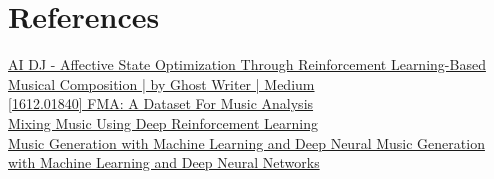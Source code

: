 \documentclass{article}
\begin{document}
\section{References}

\href{https://medium.com/@freeasabird7774/ai-dj-affective-state-optimization-through-reinforcement-learning-based-musical-composition-491d114976cf}{AI DJ - Affective State Optimization Through Reinforcement Learning-Based Musical Composition | by Ghost Writer | Medium}\\

\href{https://arxiv.org/abs/1612.01840}{[1612.01840] FMA: A Dataset For Music Analysis}\\

\href{https://www.diva-portal.org/smash/get/diva2:1383502/FULLTEXT01.pdf}{Mixing Music Using Deep Reinforcement Learning}\\

\href{https://pdf.sciencedirectassets.com/280203/1-s2.0-S1877050924X00162/1-s2.0-S1877050924027522/main.pdf?X-Amz-Security-Token=IQoJb3JpZ2luX2VjEJP%2F%2F%2F%2F%2F%2F%2F%2F%2F%2FwEaCXVzLWVhc3QtMSJHMEUCIQCSggW9gXjM%2FDfWHlQed%2FrFBZfW7O9wZSjKbE7nEdFhxAIgO5oSFbdrJ3DHKkGAxV0vHonWng0LZSKHsbbvepBC1xsqsgUIWxAFGgwwNTkwMDM1NDY4NjUiDDcL9YvR9vmpMF07IiqPBct11NEjtBETvJVACjYYtiP2LQMlD8L6MWJwH70XuApLJqdF8U8Csxqb8fK6ZOd32Nh18UCEZmyN%2FC6XGX8ykVwFsVv1EnFFvQcNGo6qvOBZEv1lgekx%2BRW2vkQgKZ2yBukwjsxFJydfCx6C2RTJjQ4UgRvJ5JQ68soo8q2WMZ%2FRux6XEqrGmnqW2JUa%2BMIlAlefH17TfCGEVWy%2F%2Fg8GpQsl2f4UkJvzfRIuvSXeCO8L39EAwAkNpYZ3Btcz1P32g34034RPRuIzlv7Aj%2FEJ%2BOlFXhyy1WSTOn7kMzsdIm16nzPeN4b8o5fkyYPINZXdSzVlqZ6dU%2BTrV8Dm4j1Ceb6X25e2d766KPsUBqGTdvv7UJBjE4zia4ImNQ5FJyTvEwl%2FvYnWfkcQio3p%2FkJTOq72YqeKCtaCT3n9DztyaUiFsjPuWscO0%2BZzdWdHp3xWvjwCePLFHOxDtofTDANpQg4e2Y2nYsle7m83CzINSmfX45mV7q4l9q3wbB8QAJMFzMrMe6rs3ruJHCG4tM03o79JH%2FOeOgr1W3iuwC%2FbA100FP7mu%2BGOARpUquH%2FQuSkuJQ3rCBfHZjl%2F509WMJJS7WpRp%2FNGfvfGS7ZdalblKejwheMp1JCc0wT3g63TS%2B2uJN82N1uQcvQkAuZ3hNp3oC%2Bx3fHZcxze6ret41Jh5JQxwhdxpJeLz3mYFsNRqNFblxh6jV1nS7huRcxrLC%2FoLuW%2F5RTGb2l%2FX%2FbG%2Ft6L1pQ2thn2v5MgSKOVPfhvPx3SZP6rOs73XzX3I0%2B8tKopa%2F%2BmZMZMV1iBkUFY8LYqCBzSEYPA3MXbn2IiiDFM%2FI5qolDe3qxtq1fWj8spJ7th9WFTYX80uHj%2FK0itFLmllEwy8G1zgY6sQFzI4hN6orfTKkrg35kLSp3vGtMS%2BcxsHLEtsB7Ovo2re76M0nLALBPRxulv%2FpvXck2JGj1TRQNkGsWxj%2BtxhoqEUQdvm7%2Fu6vR7S5Etmq55kpkH8eXXUKUgzgFjy6Zce4h7vt%2F5CyX4W%2B02Y8xW89QGg7Q9SktYGJ%2BzMMk7yxMIz1QUB4X9AdhA5VJ5fto08KYPkTD7DKq0FIxzSOXvzpGEM7qQf4twbk8ud%2BgGFs9e1A%3D&X-Amz-Algorithm=AWS4-HMAC-SHA256&X-Amz-Date=20260401T185722Z&X-Amz-SignedHeaders=host&X-Amz-Expires=300&X-Amz-Credential=ASIAQ3PHCVTY4PVZWEKO%2F20260401%2Fus-east-1%2Fs3%2Faws4_request&X-Amz-Signature=7acdc80269e2d575572f60268f94f991b962eea496ca33937dbdc02c2b7db887&hash=9c6482f510b03274a0d34a9aafb8cba1b824c4d229e5f58b66b0848e746d9e3b&host=68042c943591013ac2b2430a89b270f6af2c76d8dfd086a07176afe7c76c2c61&pii=S1877050924027522&tid=spdf-110553f9-3165-4224-a62e-64c6bb249383&sid=b6b13585367b514bd1295d1151d61505b113gxrqa&type=client&tsoh=d3d3LnNjaWVuY2VkaXJlY3QuY29t&rh=d3d3LnNjaWVuY2VkaXJlY3QuY29t&ua=151c5d03535705570c&rr=9e59d1b37b69328e&cc=us}{Music Generation with Machine Learning and Deep Neural Music Generation with Machine Learning and Deep Neural Networks}\\
\end{document}
